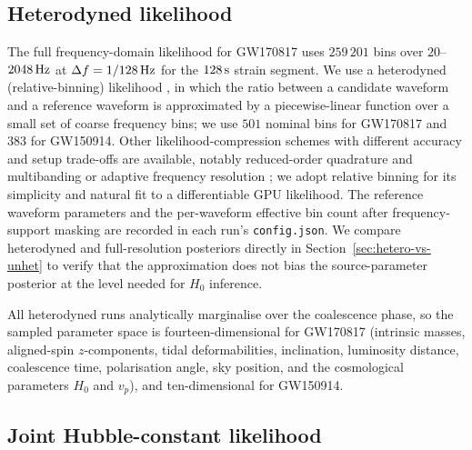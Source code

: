 \documentclass[usenatbib]{mnras}
\newcommand{\hzero}{\ensuremath{H_{0}}\xspace}
\begin{document}
\subsection{Heterodyned likelihood}

The full frequency-domain likelihood for GW170817 uses $259\,201$ bins over $20$--$2048\,\rm Hz$ at $\Delta f=1/128\,\rm Hz$ for the $128\,\rm s$ strain segment. We use a heterodyned (relative-binning) likelihood \citep{Cornish2010,Zackay2018RelativeBinning}, in which the ratio between a candidate waveform and a reference waveform is approximated by a piecewise-linear function over a small set of coarse frequency bins; we use $501$ nominal bins for GW170817 and $383$ for GW150914. Other likelihood-compression schemes with different accuracy and setup trade-offs are available, notably reduced-order quadrature \citep{Smith2016ROQ} and multibanding or adaptive frequency resolution \citep{Vinciguerra2017Multiband,Morisaki2021Multiband}; we adopt relative binning for its simplicity and natural fit to a differentiable GPU likelihood. The reference waveform parameters and the per-waveform effective bin count after frequency-support masking are recorded in each run's \texttt{config.json}. We compare heterodyned and full-resolution posteriors directly in Section~\ref{sec:hetero-vs-unhet} to verify that the approximation does not bias the source-parameter posterior at the level needed for \hzero inference.

All heterodyned runs analytically marginalise over the coalescence phase, so the sampled parameter space is fourteen-dimensional for GW170817 (intrinsic masses, aligned-spin $z$-components, tidal deformabilities, inclination, luminosity distance, coalescence time, polarisation angle, sky position, and the cosmological parameters $\hzero$ and $v_{p}$), and ten-dimensional for GW150914.

\subsection{Joint Hubble-constant likelihood}
\end{document}
